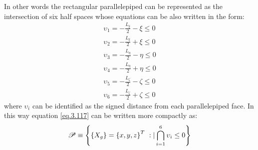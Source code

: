   In other words the rectangular parallelepiped can be represented as the intersection of six half spaces whose equations can be also written in the form:
  \begin{eqnarray}
  \upsilon_1=-\frac{L_\xi}{2}-\xi\leq 0\\
    \upsilon_2=-\frac{L_\xi}{2}+\xi\leq 0\\
      \upsilon_3=-\frac{L_\eta}{2}-\eta\leq 0\\
     \upsilon_4= -\frac{L_\eta}{2}+\eta\leq 0\\
        \upsilon_5=-\frac{L_\zeta}{2}-\zeta\leq 0\\
        \upsilon_6=-\frac{L_\zeta}{2}+\zeta\leq 0
  \end{eqnarray}
  where $\upsilon_i$ can be identified as the signed distance from each parallelepiped face. In this way equation \eqref{eq.3.117} can be written more compactly as:
  \begin{equation}
    \label{eq.3.124}
    \mathscr{P}\equiv\left\lbrace{\ensuremath\left\lbrace{X_g}\right \rbrace=\ensuremath\left\lbrace{x,y,z}\right \rbrace^T\ :| \bigcap_{i=1}^6{\upsilon_i\leq 0}}\right \rbrace
    \end{equation}
